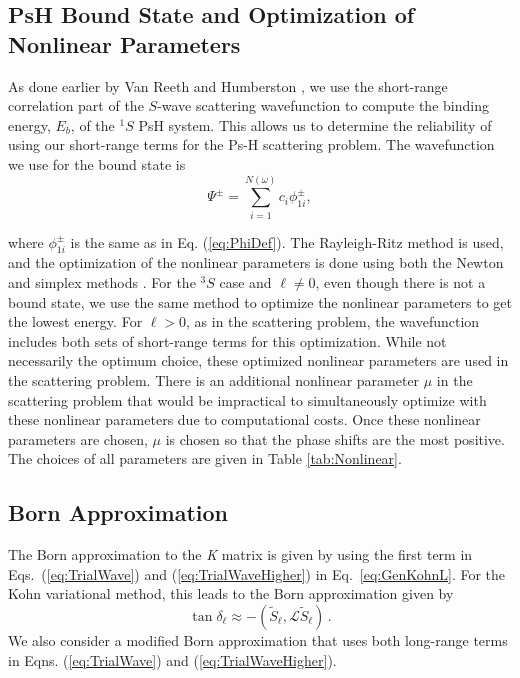 \documentclass[preprint,showpacs,showkeys,preprintnumbers,amsmath,amssymb,longbibliography,pra,aps]{revtex4-1}
\begin{document}

\subsection{PsH Bound State and Optimization of Nonlinear Parameters}
As done earlier by Van Reeth and Humberston \cite{VanReeth2003,VanReeth2004},
we use the short-range correlation part of the $S$-wave scattering wavefunction
to compute the binding energy, $E_b$, of the $^1S$ PsH system. This allows us
to determine the reliability of using our short-range terms for the Ps-H 
scattering problem. The wavefunction we use for the bound state is
\begin{equation}
\label{eq:BoundWavefn}
\Psi^\pm = \sum_{i=1}^{N(\omega)} c_i \phi_{1i}^\pm,
\end{equation}

where $\phi_{1i}^\pm$ is the same as in Eq. (\ref{eq:PhiDef}). The
Rayleigh-Ritz method is used, and the optimization of the nonlinear parameters
is done using both the Newton \cite{Yan1999} and simplex methods \cite{GSL}.
For the $^3S$ case and $\ell \neq 0$, even though there is not a bound state,
we use 
the same method to optimize the nonlinear parameters to get the lowest 
energy. For $\ell > 0$, as in the scattering problem, the wavefunction 
includes both sets of short-range terms for this optimization. While not 
necessarily the optimum choice, these optimized nonlinear parameters are used 
in the scattering problem. There is an additional nonlinear parameter $\mu$ 
in the scattering problem that would be impractical to simultaneously 
optimize with these nonlinear parameters due to computational costs. Once 
these nonlinear parameters are chosen, $\mu$ is chosen so that the phase 
shifts are the most positive. The choices of all parameters are given in 
Table \ref{tab:Nonlinear}.

\subsection{Born Approximation}

The Born approximation to the \emph{K} matrix \cite{Bransden2003} is given by
using the first term in Eqs.~(\ref{eq:TrialWave}) and
(\ref{eq:TrialWaveHigher}) in Eq.~\ref{eq:GenKohnL}. For the Kohn variational
method, this leads to the Born approximation given by
\begin{equation}
\label{eq:Born}
\tan\delta_\ell \approx -(\widetilde{S}_\ell,\mathcal{L}\widetilde{S}_\ell )\,.
\end{equation}
We also consider a modified Born approximation that uses both long-range terms
in Eqns. (\ref{eq:TrialWave}) and (\ref{eq:TrialWaveHigher}).
\end{document}
